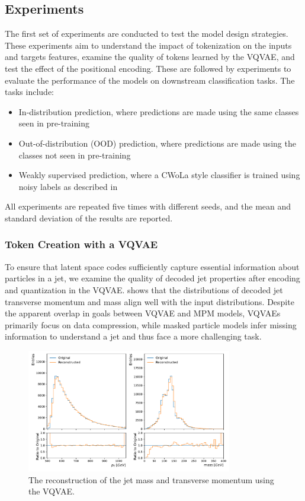 \subsection{Experiments}

The first set of experiments are conducted to test the model design strategies.
These experiments aim to understand the impact of tokenization on the inputs and targets features, examine the quality of tokens learned by the VQVAE, and test the effect of the positional encoding.
These are followed by experiments to evaluate the performance of the models on downstream classification tasks.
The tasks include:
\begin{itemize}
    \item In-distribution prediction, where predictions are made using the same classes seen in pre-training
    \item Out-of-distribution (OOD) prediction, where predictions are made using the classes not seen in pre-training
    \item Weakly supervised prediction, where a CWoLa style classifier is trained using noisy labels as described in 
\end{itemize}
All experiments are repeated five times with different seeds, and the mean and standard deviation of the results are reported.

\subsubsection{Token Creation with a VQVAE}

To ensure that latent space codes sufficiently capture essential information about particles in a jet, we examine the quality of decoded jet properties after encoding and quantization in the VQVAE.
 shows that the distributions of decoded jet transverse momentum and mass align well with the input distributions.
Despite the apparent overlap in goals between VQVAE and MPM models, VQVAEs primarily focus on data compression, while masked particle models infer missing information to understand a jet and thus face a more challenging task.

\begin{figure}[htp!]
    \centering
    \includegraphics[width=0.8\textwidth]{Figures/foundation_models/mpm1/jet_high_img.pdf}
    \caption{
        \label{fig:vq_vae}
        The reconstruction of the jet mass and transverse momentum using the VQVAE.
    }
\end{figure}

